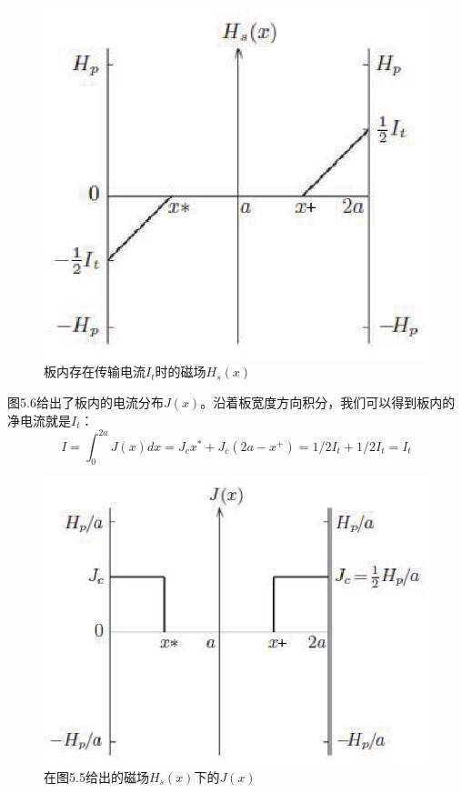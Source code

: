 \begin{figure}[htbp]
  \centering
 \includegraphics[scale=0.8]{chpt5/figs/fig5.5.eps}
  \caption{板内存在传输电流$I_t$时的磁场$H_s(x)$}\label{fig:hwithi}
\end{figure}

图5.6给出了板内的电流分布$J(x)$。沿着板宽度方向积分，我们可以得到板内的净电流就是$I_t$：
\begin{equation}
  I=\int_{0}^{2a}J(x)dx=J_c x^*+J_c(2a-x^+)=1/2 I_t +1/2 I_t=I_t
\end{equation}

\begin{figure}[htbp]
  \centering
 \includegraphics[bb=0 0 800 600]{chpt5/figs/fig5.6.eps}
  \caption{在图5.5给出的磁场$H_s(x)$下的$J(x)$}\label{fig:jtoh5.5}
\end{figure}

